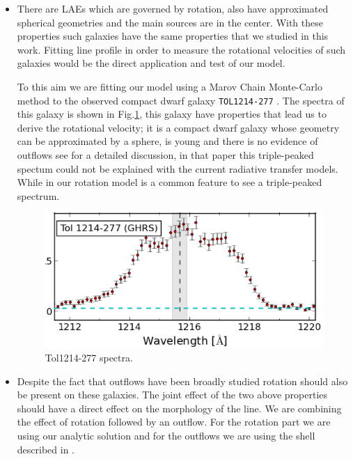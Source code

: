\begin{itemize}


\item There are LAEs which are governed by rotation, also 
have approximated spherical geometries and the main \ly sources are in the center. 
With these properties such galaxies have the same properties 
that we studied in this work.  
Fitting \ly line profile in order  to measure the rotational 
velocities of such galaxies would be the direct application 
and test of our model. 

To this aim we are fitting our model using a Marov Chain Monte-Carlo 
method to the observed compact dwarf galaxy \verb+TOL1214-277+\citep{Thuan97, Verhamme15}
. The spectra of this galaxy is shown in Fig.\ref{fig:tol}, 
this galaxy have properties that lead us to derive the rotational 
velocity; it is a compact dwarf galaxy whose geometry can be approximated by a sphere, 
is young and there is no evidence of outflows see \citep{Verhamme15} for a detailed
discussion, in that paper this triple-peaked spectum could not be explained
with the current radiative transfer models. While in our rotation 
model is a common feature to see a triple-peaked spectrum. 

\begin{figure} 
\begin{center}
\includegraphics[scale=0.6]{Figures/tol.png}
\end{center}\caption{Tol1214-277 spectra.\label{fig:tol}} 
\end{figure}

\item Despite the fact that outflows have been broadly studied rotation should 
also be present on these galaxies. The joint effect of the two above properties 
should have a direct effect on the morphology of the \lya line. We are 
 combining the effect of rotation followed by an outflow. For the rotation
part we are using our analytic solution and for the outflows
we are using the shell described in \citep{Verhamme12}. 
\end{itemize}
